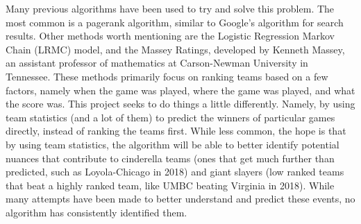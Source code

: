 Many previous algorithms have been used to try and solve this problem.  
The most common is a pagerank algorithm, similar to Google's algorithm for search results.  
Other methods worth mentioning are the Logistic Regression Markov Chain (LRMC) model, and the Massey Ratings, developed by Kenneth Massey, an assistant professor of mathematics at Carson-Newman University in Tennessee.  
These methods primarily focus on ranking teams based on a few factors, namely when the game was played, where the game was played, and what the score was.  
This project seeks to do things a little differently.  
Namely, by using team statistics (and a lot of them) to predict the winners of particular games directly, instead of ranking the teams first.  
While less common, the hope is that by using team statistics, the algorithm will be able to better identify potential nuances that contribute to cinderella teams (ones that get much further than predicted, such as Loyola-Chicago in 2018) and giant slayers (low ranked teams that beat a highly ranked team, like UMBC beating Virginia in 2018).  
While many attempts have been made to better understand and predict these events, no algorithm has consistently identified them.  